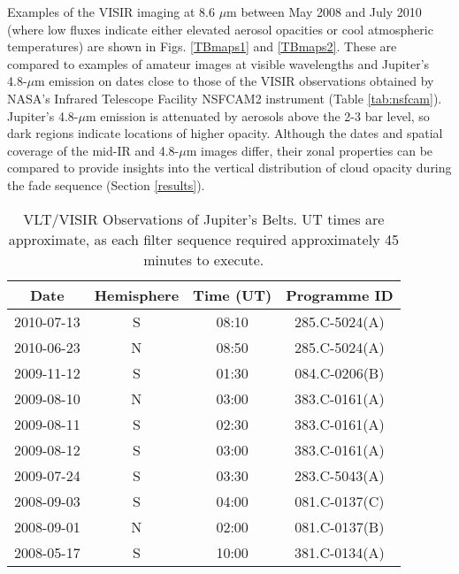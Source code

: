 \documentclass[final,5p,times,twocolumn,authoryear]{elsarticle}
\begin{document}
Examples of the VISIR imaging at 8.6 $\mu$m between May 2008 and July 2010 (where low fluxes indicate either elevated aerosol opacities or cool atmospheric temperatures) are shown in Figs. \ref{TBmaps1} and \ref{TBmaps2}.  These are compared to examples of amateur images at visible wavelengths and Jupiter's 4.8-$\mu$m emission on dates close to those of the VISIR observations obtained by NASA's Infrared Telescope Facility NSFCAM2 instrument (Table \ref{tab:nsfcam}).  Jupiter's 4.8-$\mu$m emission is attenuated by aerosols above the 2-3 bar level, so dark regions indicate locations of higher opacity.  Although the dates and spatial coverage of the mid-IR and 4.8-$\mu$m images differ, their zonal properties can be compared to provide insights into the vertical distribution of cloud opacity during the fade sequence (Section \ref{results}).



\begin{table}[htdp]
\caption{VLT/VISIR Observations of Jupiter's Belts.  UT times are approximate, as each filter sequence required approximately 45 minutes to execute.}
\begin{center}
\begin{tabular}{|c|c|c|c|}
\hline
Date & Hemisphere & Time (UT) & Programme ID \\
\hline
2010-07-13 & S & 08:10 & 285.C-5024(A) \\
2010-06-23 & N & 08:50 & 285.C-5024(A) \\
2009-11-12 & S & 01:30 & 084.C-0206(B) \\
2009-08-10 & N & 03:00 & 383.C-0161(A) \\
2009-08-11 & S & 02:30 & 383.C-0161(A) \\
2009-08-12 & S & 03:00 & 383.C-0161(A) \\
2009-07-24 & S & 03:30 & 283.C-5043(A) \\
2008-09-03 & S & 04:00 & 081.C-0137(C) \\
2008-09-01 & N & 02:00 & 081.C-0137(B) \\
2008-05-17 & S & 10:00 & 381.C-0134(A) \\
\hline
\end{tabular}
\end{center}
\label{tab:data}
\end{table}%
\end{document}
